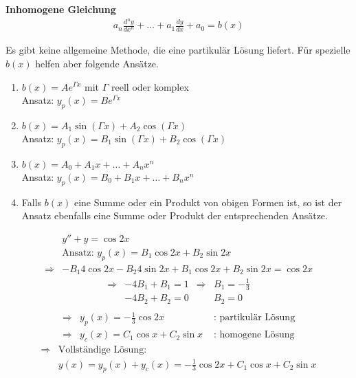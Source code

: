 {\bf Inhomogene Gleichung}
\begin{align}
 a_n\frac{d^ny}{dx^n} + \ldots + a_1\frac{dy}{dx} + a_0 = b(x)
\end{align}

Es gibt keine allgemeine Methode, die eine partikulär Lösung liefert. Für
spezielle $b(x)$ helfen aber folgende Ansätze.
\begin{enumerate}
  \item $b(x) = Ae^{\Gamma x}$ mit $\Gamma$ reell oder komplex\\
  Ansatz: $y_p(x) = Be^{\Gamma x}$
  \item $b(x) = A_1\sin(\Gamma x) + A_2\cos(\Gamma x)$\\
  Ansatz: $y_p(x) = B_1\sin(\Gamma x) + B_2\cos(\Gamma x)$
  \item $b(x) = A_0 + A_1x+\ldots+A_nx^n$\\
  Ansatz: $y_p(x) = B_0+B_1x+\ldots+B_nx^n$
  \item Falls $b(x)$ eine Summe oder ein Produkt von obigen Formen ist, so ist der Ansatz ebenfalls eine Summe oder Produkt der entsprechenden Ansätze.
\end{enumerate}

\begin{Beispiel}
 \begin{align*}
  & y'' + y = \cos{2x}\\
&\text{Ansatz: } y_p(x) = B_1\cos{2x} + B_2\sin{2x}\\
\Rightarrow & -B_1 4\cos{2x} - B_2 4\sin{2x} + B_1\cos{2x} + B_2\sin{2x} = \cos{2x}
 \end{align*}
\begin{align*}
 \Rightarrow & -4B_1 +B_1 = 1 & \Rightarrow  & B_1 = -\frac{1}{3}\\
&-4B_2 +B_2 = 0 & & B_2 = 0\\
\end{align*}
\begin{align*}
 \Rightarrow & y_p(x) = -\frac{1}{3}\cos{2x} & \text{ : partikulär Lösung}\\
 \Rightarrow & y_c(x) = C_1\cos{x}+C_2\sin{x} & \text{ : homogene Lösung}
\end{align*}
\begin{align*}
 \Rightarrow & \text{Vollständige Lösung:}\\
  & y(x) = y_p(x)+y_c(x) = -\frac{1}{3}\cos{2x}+C_1\cos{x}+C_2\sin{x}
\end{align*}
\end{Beispiel}


